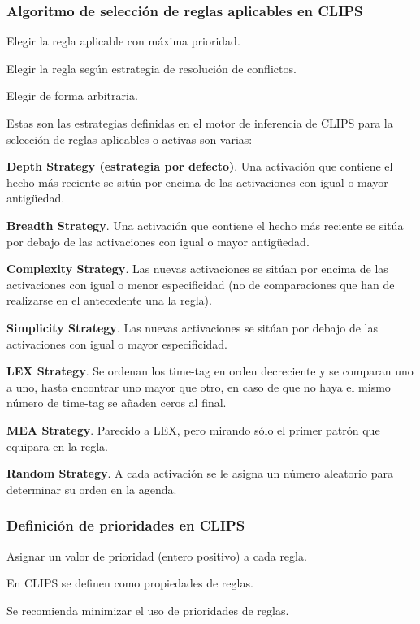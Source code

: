 \subsubsection{Algoritmo de selección de reglas aplicables en CLIPS}
\begin{compactitem}
  \item Elegir la regla aplicable con máxima prioridad.
  \item Elegir la regla según estrategia de resolución de conflictos.
  \item Elegir de forma arbitraria.
\end{compactitem}

Estas son las estrategias definidas en el motor de inferencia de CLIPS para
 la selección de reglas aplicables o activas son varias:

\begin{compactitem}
  \item \textbf{Depth Strategy (estrategia por defecto)}. Una activación que contiene el hecho
    más reciente se sitúa por encima de las activaciones con igual o mayor antigüedad.
 \item \textbf{Breadth Strategy}. Una activación que contiene el hecho más reciente se
    sitúa por debajo de las activaciones con igual o mayor antigüedad.
 \item \textbf{Complexity Strategy}. Las nuevas activaciones se sitúan por encima de las
    activaciones con igual o menor especificidad (no de comparaciones que han de
    realizarse en el antecedente una la regla).
 \item \textbf{Simplicity Strategy}. Las nuevas activaciones se sitúan por debajo de las
    activaciones con igual o mayor especificidad.
 \item \textbf{LEX Strategy}. Se ordenan los time-tag en orden decreciente y se comparan
    uno a uno, hasta encontrar uno mayor que otro, en caso de que no haya el mismo
    número de time-tag se añaden ceros al final.
 \item \textbf{MEA Strategy}. Parecido a LEX, pero mirando sólo el primer patrón que
    equipara en la regla.
 \item \textbf{Random Strategy}. A cada activación se le asigna un número aleatorio para
    determinar su orden en la agenda.
\end{compactitem}

\subsubsection{Definición de prioridades en CLIPS}
\begin{compactitem}
  \item Asignar un valor de prioridad (entero positivo) a cada regla.
  \item En CLIPS se definen como propiedades de reglas.
  \item Se recomienda minimizar el uso de prioridades de reglas.
\end{compactitem}

